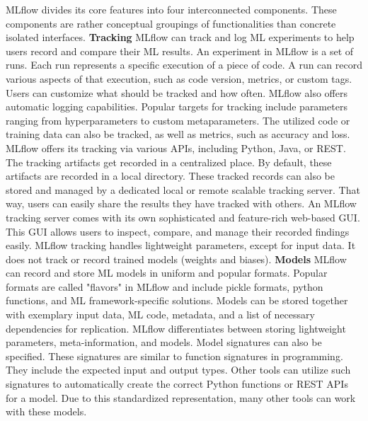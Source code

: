 MLflow divides its core features into four interconnected components.
These components are rather conceptual groupings of functionalities than concrete isolated interfaces.
\vspace{5mm}
\newline
\textbf{Tracking}\newline
MLflow can track and log ML experiments to help users record and compare their ML results.
An experiment in MLflow is a set of runs.
Each run represents a specific execution of a piece of code.
A run can record various aspects of that execution, such as code version, metrics, or custom tags.
Users can customize what should be tracked and how often.
MLflow also offers automatic logging capabilities.
Popular targets for tracking include parameters ranging from hyperparameters to custom metaparameters.
The utilized code or training data can also be tracked, as well as metrics, such as accuracy and loss.
MLflow offers its tracking via various APIs, including Python, Java, or REST.
The tracking artifacts get recorded in a centralized place.
By default, these artifacts are recorded in a local directory.
These tracked records can also be stored and managed by a dedicated local or remote scalable tracking server.
That way, users can easily share the results they have tracked with others.
An MLflow tracking server comes with its own sophisticated and feature-rich web-based GUI.
This GUI allows users to inspect, compare, and manage their recorded findings easily.
MLflow tracking handles lightweight parameters, except for input data.
It does not track or record trained models (weights and biases).
\vspace{5mm}
\newline
\textbf{Models}\newline
MLflow can record and store ML models in uniform and popular formats.
Popular formats are called "flavors" in MLflow and include pickle formats, python functions, and ML framework-specific solutions.
Models can be stored together with exemplary input data, ML code, metadata, and a list of necessary dependencies for replication.
MLflow differentiates between storing lightweight parameters, meta-information, and models.
Model signatures can also be specified.
These signatures are similar to function signatures in programming.
They include the expected input and output types.
Other tools can utilize such signatures to automatically create the correct Python functions or REST APIs for a model.
Due to this standardized representation, many other tools can work with these models.
